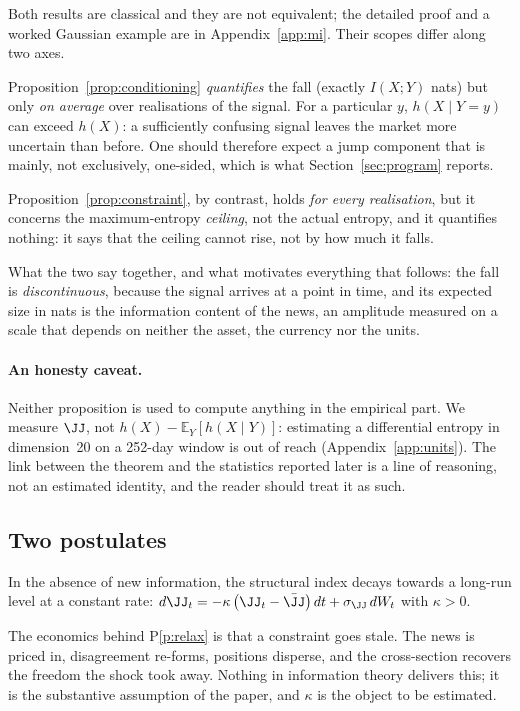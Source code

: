 Both results are classical \citep{cover2006} and they are not equivalent; the
detailed proof and a worked Gaussian example are in Appendix~\ref{app:mi}. Their
scopes differ along two axes.

Proposition~\ref{prop:conditioning} \emph{quantifies} the fall (exactly
$I(X;Y)$ nats) but only \emph{on average} over realisations of the signal. For a
particular $y$, $h(X\mid Y=y)$ can exceed $h(X)$: a sufficiently confusing signal
leaves the market more uncertain than before. One should therefore expect a jump
component that is mainly, not exclusively, one-sided, which is what
Section~\ref{sec:program} reports.

Proposition~\ref{prop:constraint}, by contrast, holds \emph{for every
realisation}, but it concerns the maximum-entropy \emph{ceiling}, not the actual
entropy, and it quantifies nothing: it says that the ceiling cannot rise, not by
how much it falls.

What the two say together, and what motivates everything that follows: the fall
is \emph{discontinuous}, because the signal arrives at a point in time, and its
expected size in nats is the information content of the news, an amplitude
measured on a scale that depends on neither the asset, the currency nor the
units.

\paragraph{An honesty caveat.} Neither proposition is used to compute anything in
the empirical part. We measure $\JJ$, not $h(X)-\mathbb{E}_Y[h(X\mid Y)]$:
estimating a differential entropy in dimension~20 on a 252-day window is out of
reach (Appendix~\ref{app:units}). The link between the theorem and the
statistics reported later is a line of reasoning, not an estimated identity, and
the reader should treat it as such.

\subsection{Two postulates}

\begin{postulate}[Relaxation]
\label{p:relax}
In the absence of new information, the structural index decays towards a
long-run level at a constant rate:
$d\JJ_t = -\kappa\left(\JJ_t-\bar\JJ\right)dt + \sigma_\JJ\,dW_t$ with $\kappa>0$.
\end{postulate}

The economics behind P\ref{p:relax} is that a constraint goes stale. The news is
priced in, disagreement re-forms, positions disperse, and the cross-section
recovers the freedom the shock took away. Nothing in information theory delivers
this; it is the substantive assumption of the paper, and $\kappa$ is the object
to be estimated.

